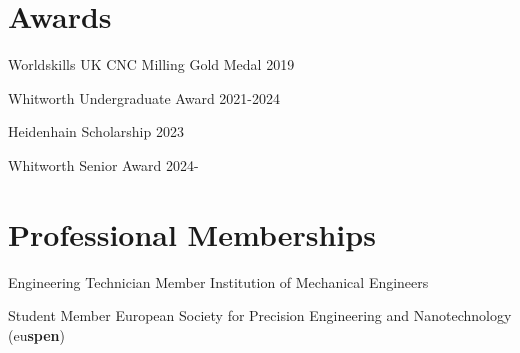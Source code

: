 \documentclass{cv}
\begin{document}
\section{Awards}

Worldskills UK CNC Milling Gold Medal 2019

Whitworth Undergraduate Award 2021-2024

Heidenhain Scholarship 2023

Whitworth Senior Award 2024-

\section{Professional Memberships}

Engineering Technician Member Institution of Mechanical Engineers

Student Member European Society for Precision Engineering and Nanotechnology (eu\textbf{spen})
\end{document}

